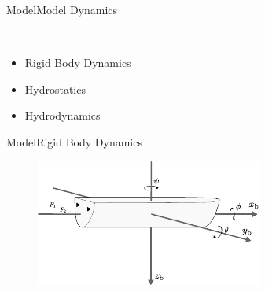 \begin{frame}{Model}{Model Dynamics}
\begin{minipage}{0.3\linewidth}
\begin{figure}[H]
        \end{figure}                
    \end{minipage}\hfill \\
    \begin{itemize}
        \item Rigid Body Dynamics
        \item Hydrostatics
        \item Hydrodynamics
    \end{itemize}
\end{frame}

\begin{frame}{Model}{Rigid Body Dynamics}
    \begin{minipage}{0.65\linewidth}
        \begin{figure}[H]
            \centering
            \includegraphics[width=1\linewidth]{figures/boat3DForces}
        \end{figure}        
    \end{minipage}\hfill      
    \begin{minipage}{0.3\linewidth}
        \begin{figure}[H]
            \centering

\end{figure}
\end{minipage}
\end{frame}
